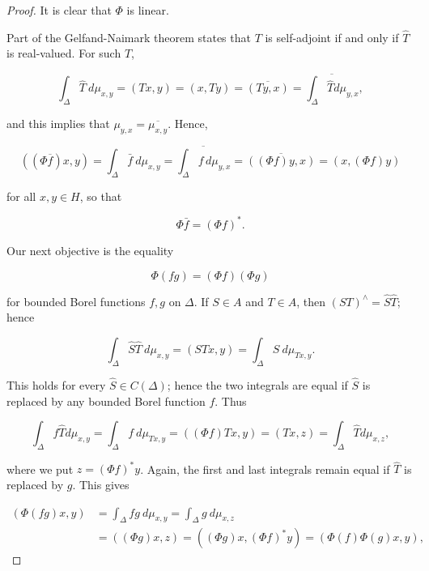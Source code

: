 \begin{proof}
  It is clear that \( \Phi \) is linear.

  Part of the Gelfand-Naimark theorem states that \( T \) is self-adjoint if and only if \( \hat{T} \) is real-valued. For such \( T \),

  \[
    \int_{\Delta} \widehat{T} \ d\mu_{x,y} = (Tx, y) = (x, Ty) = \overline{(Ty, x)} = \overline{\int_{\Delta} \hat{T} d\mu_{y,x}},
  \]

  and this implies that \( \mu_{y,x} = \overline{\mu_{x,y}} \).
  Hence,

  \[
    ((\Phi \overline{f})x, y) = \int_{\Delta} \bar{f} \ d\mu_{x,y} = \overline{\int_{\Delta} f \, d\mu_{y,x}} = \overline{((\Phi f)y, x)} = (x, (\Phi f)y)
  \]

  for all \( x, y \in H \), so that

  \begin{equation}
    \label{eq:7}
    \Phi \bar{f} = (\Phi f)^*.
  \end{equation}

  Our next objective is the equality

  \begin{equation}
    \label{eq:8}
    \Phi (fg) = (\Phi f)(\Phi g)
  \end{equation}

  for bounded Borel functions \( f, g \) on \( \Delta \). If \( S \in A \) and \( T \in A \), then
  \( (ST)^{\wedge} = \widehat{S} \widehat{T} \);
  hence

  \[
    \int_{\Delta} \hat{S} \hat{T} \ d\mu_{x,y} = (STx, y) = \int_{\Delta} \widehat{S} \ d\mu_{Tx,y}.
  \]

  This holds for every \( \widehat{S} \in C(\Delta) \);
  hence the two integrals are equal if \( \widehat{S} \) is
  replaced by any bounded Borel function \( f \). Thus

  \[
    \int_{\Delta} f \widehat{T} d\mu_{x,y} = \int_{\Delta} f \ d\mu_{Tx,y} = ((\Phi f)Tx, y) = (Tx, z) = \int_{\Delta} \hat{T} d\mu_{x,z},
  \]

  where we put \( z = (\Phi f)^* y \).
  Again, the first and last integrals remain
  equal if \( \widehat{T} \) is replaced by \( g \).
  This gives

  \[
    \begin{aligned}
      (\Phi (fg)x, y) & = \int_{\Delta} fg \ d\mu_{x,y} = \int_{\Delta} g \ d\mu_{x,z}          \\
                      & = ((\Phi g)x, z) = ((\Phi g)x, (\Phi f)^* y) = (\Phi (f) \Phi (g)x, y),
    \end{aligned}
  \]


\end{proof}
